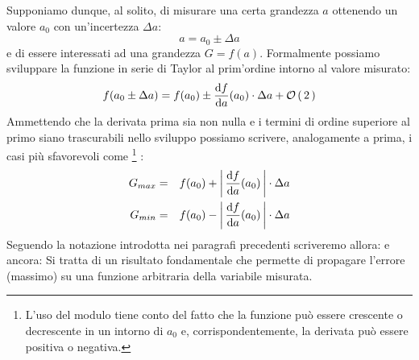 \begin{exemplify}


\end{exemplify}

\noindent Supponiamo dunque, al solito, di misurare una certa grandezza
$a$ ottenendo un valore $a_0$ con un'incertezza $\Delta a$:
$$
a = a_0 \pm \Delta a
$$
e di essere interessati ad una grandezza $G = f(a)$.
Formalmente possiamo sviluppare la funzione in serie di Taylor al
prim'ordine intorno al valore misurato:
$$
f(a_0 \pm \Delta a) = f(a_0) \pm \displaystyle \frac{\mathrm{d} f}{\mathrm{d} a}({a_0}) \cdot \Delta a +
{\cal O} \left( \, 2 \, \right) 
$$
Ammettendo che la derivata prima sia non nulla e i termini di ordine superiore
al primo siano trascurabili nello sviluppo possiamo scrivere, analogamente a
prima, i casi pi\`u sfavorevoli come%
\footnote{
L'uso del modulo tiene conto del fatto che la funzione pu\`o essere crescente
o decrescente in un intorno di $a_0$ e, corrispondentemente, la derivata
pu\`o essere positiva o negativa.
}%
:
\begin{eqnarray*}
G_{max} & = & f(a_0) + \left| \, \displaystyle \frac{\mathrm{d} f}{\mathrm{d} a}({a_0}) \, \right| \cdot \Delta a\\
G_{min} & = & f(a_0) - \left| \, \displaystyle \frac{\mathrm{d} f}{\mathrm{d} a}({a_0}) \, \right| \cdot \Delta a
\end{eqnarray*}
Seguendo la notazione introdotta nei paragrafi precedenti scriveremo
allora:
e ancora:
Si tratta di un risultato fondamentale che permette di propagare
l'errore (massimo) su una funzione arbitraria della variabile misurata.


